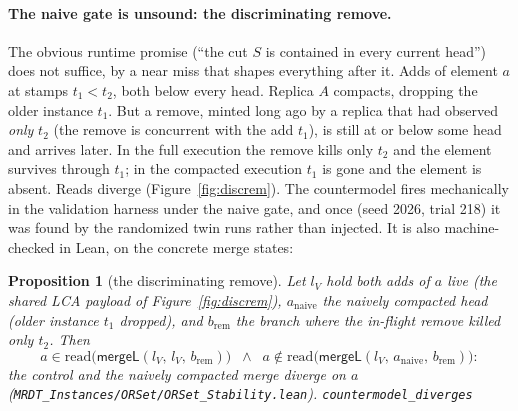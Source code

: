 \documentclass[11pt]{article}
\newtheorem{proposition}[theorem]{Proposition}
\newcommand{\mergeL}{\mathsf{mergeL}}
\newcommand{\lean}[1]{\texttt{#1}}
\begin{document}
\paragraph{The naive gate is unsound: the discriminating remove.} The
obvious runtime promise (``the cut $S$ is contained in every current
head'') does not suffice, by a near miss that shapes everything after
it. Adds of element $a$ at stamps $t_1 < t_2$, both below every head.
Replica $A$ compacts, dropping the older instance $t_1$. But a remove,
minted long ago by a replica that had observed \emph{only} $t_2$ (the
remove is concurrent with the add $t_1$), is still at or below some
head and arrives later. In the full execution the remove kills only
$t_2$ and the element survives through $t_1$; in the compacted
execution $t_1$ is gone and the element is absent. Reads diverge
(Figure~\ref{fig:discrem}). The countermodel fires mechanically in the
validation harness under the naive gate, and once (seed 2026, trial
218) it was found by the randomized twin runs rather than injected. It
is also machine-checked in Lean, on the concrete merge states:

\begin{proposition}[the discriminating remove]
\label{prop:discrem}
Let $l_V$ hold both adds of $a$ live (the shared LCA payload of
Figure~\ref{fig:discrem}), $a_{\mathrm{naive}}$ the naively compacted
head (older instance $t_1$ dropped), and $b_{\mathrm{rem}}$ the branch
where the in-flight remove killed only $t_2$. Then
\[
  a \in \mathrm{read}\bigl(\mergeL(l_V,\, l_V,\, b_{\mathrm{rem}})\bigr)
  \;\;\wedge\;\;
  a \notin \mathrm{read}\bigl(\mergeL(l_V,\, a_{\mathrm{naive}},\,
  b_{\mathrm{rem}})\bigr) :
\]
the control and the naively compacted merge diverge on $a$
(\lean{MRDT\_Instances/ORSet/ORSet\_Stability.lean}).
\hfill\lean{countermodel\_diverges}
\end{proposition}
\end{document}
